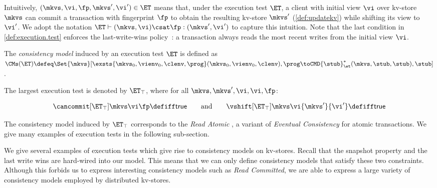 Intuitively, \((\mkvs, \vi, \fp, \mkvs', \vi') \in \ET\) means that, under the execution test \(\ET\),
a client with initial view \(\vi\) over kv-store \(\mkvs\) can commit a transaction with 
fingerprint \(\fp\) to obtain the resulting kv-store \(\mkvs'\) (\cref{def:updatekv}) while shifting its view
to \(\vi'\). We adopt the notation \(\ET \vdash (\mkvs, \vi) \csat \fp: (\mkvs', \vi')\) to capture this intuition. 
Note that the last condition in \cref{def:execution.test} enforces the last-write-wins
policy~\cite{vogels:2009:ec:1435417.1435432}: 
a transaction always reads the most recent writes from the initial view \(\vi\).  

\SpaceAboveDef
\begin{definition}
\label{def:cm}
The \emph{consistency model} induced by an execution test \(\ET\) is defined as 
\(
\CMs(\ET) \defeq 
\Set{\mkvs}[ 
\exsts{\mkvs_0,\vienv_0,\clenv,\prog}
(\mkvs_0,\vienv_0,\clenv),\prog \toCMD{\stub}_{\et}^{*} (\mkvs, \stub, \stub),\stub
]
\).
\end{definition}
\SpaceBelowDef

The largest execution test is denoted by \(\ET_{\top}\), where for all \(\mkvs, \mkvs', \vi, \vi, \fp\):%

\SpaceAboveMath
\[
	\cancommit[\ET_{\top}] \mkvs \vi \fp \defiff \mathsf{true}
	\qquad  \text{and} \qquad 
	\vshift[\ET_{\top}] \mkvs \vi {\mkvs'} {\vi'} \defiff \mathsf{true}
\]%
\SpaceBelowMath

The consistency model induced by \(\ET_{\top}\) 
corresponds to the \emph{Read Atomic} \cite{ramp}, a variant of \emph{Eventual 
Consistency} \cite{ev_transactions} for atomic transactions. 
We give many examples of execution tests in the following sub-section. 



\label{subsec:cm_examples}
We give several examples of execution tests which give rise to consistency
models on kv-stores.
Recall that the snapshot property and the last write wins are hard-wired into our model. 
This means that we can only define  consistency models that satisfy these two constraints. 
Although this forbids us to express interesting consistency models such as \emph{Read Committed}, we are able to express a large variety of consistency models employed by distributed kv-stores.

